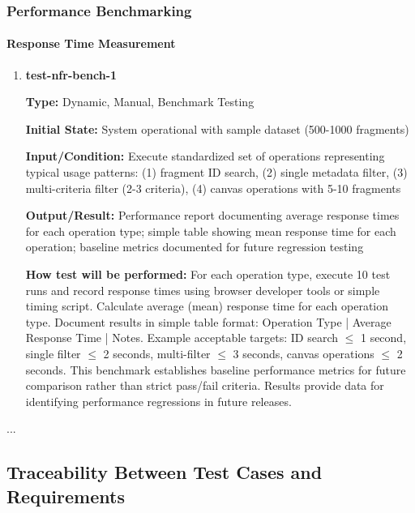 \documentclass[12pt, titlepage]{article}
\begin{document}
\subsubsection{Performance Benchmarking}

\paragraph{Response Time Measurement}

\begin{enumerate}

\item \textbf{test-nfr-bench-1}

\textbf{Type:} Dynamic, Manual, Benchmark Testing

\textbf{Initial State:} System operational with sample dataset (500-1000 fragments)

\textbf{Input/Condition:} Execute standardized set of operations representing typical usage patterns: (1) fragment ID search, (2) single metadata filter, (3) multi-criteria filter (2-3 criteria), (4) canvas operations with 5-10 fragments

\textbf{Output/Result:} Performance report documenting average response times for each operation type; simple table showing mean response time for each operation; baseline metrics documented for future regression testing

\textbf{How test will be performed:} For each operation type, execute 10 test runs and record response times using browser developer tools or simple timing script. Calculate average (mean) response time for each operation type. Document results in simple table format: Operation Type | Average Response Time | Notes. Example acceptable targets: ID search $\leq$ 1 second, single filter $\leq$ 2 seconds, multi-filter $\leq$ 3 seconds, canvas operations $\leq$ 2 seconds. This benchmark establishes baseline performance metrics for future comparison rather than strict pass/fail criteria. Results provide data for identifying performance regressions in future releases.

\end{enumerate}

...

\subsection{Traceability Between Test Cases and Requirements}

\end{document}
